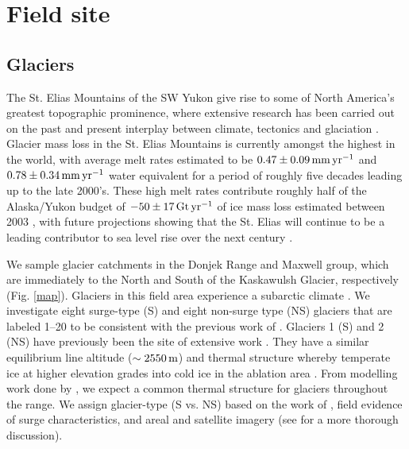 \documentclass[review]{igs}
\begin{document}
\section{Field site}

\subsection{Glaciers}

The St. Elias Mountains of the SW Yukon give rise to some of North America's greatest topographic prominence, where extensive research has been carried out on the past and present interplay between climate, tectonics and glaciation \citep[e.g.][]{Theberge1980}. Glacier mass loss in the St. Elias Mountains is currently amongst the highest in the world, with average melt rates estimated to be $\rm 0.47\pm0.09\,mm\,yr^{-1}$ \citep{Etienne2010} and $\rm0.78\pm0.34\,mm\,yr^{-1}$ \citep{Barrand2010} water equivalent for a period of roughly five decades leading up to the late 2000's. These high melt rates contribute roughly half of the Alaska/Yukon budget of $\rm -50\pm17\,Gt\,yr^{-1}$ of ice mass loss estimated between 2003 \citep{Gardner2013}, with future projections showing that the St. Elias will continue to be a leading contributor to sea level rise over the next century \citep{Radic2011}. 

We sample glacier catchments in the Donjek Range and Maxwell group, which are immediately to the North and South of the Kaskawulsh Glacier, respectively (Fig. \ref{map}). Glaciers in this field area experience a subarctic climate \citep{Macdougall2011}. We investigate eight surge-type (S) and eight non-surge type (NS) glaciers that are labeled 1--20 to be consistent with the previous work of \cite{Crompton2016}. Glaciers 1 (S) and 2 (NS) have previously been the site of extensive work \citep[e.g.][]{Wheler2009,Flowers2011,Schoof2014}. They have a similar equilibrium line altitude ($\rm \sim 2550\,m$) and thermal structure whereby temperate ice at higher elevation grades into cold ice in the ablation area \citep{Wilson2013}. From modelling work done by \cite{Wilson2013a}, we expect a common thermal structure for glaciers throughout the range. We assign glacier-type (S vs. NS) based on the work of \cite{Clarke1986}, field evidence of surge characteristics, and areal and satellite imagery (see \cite{Crompton2016} for a more thorough discussion).  
\end{document}
